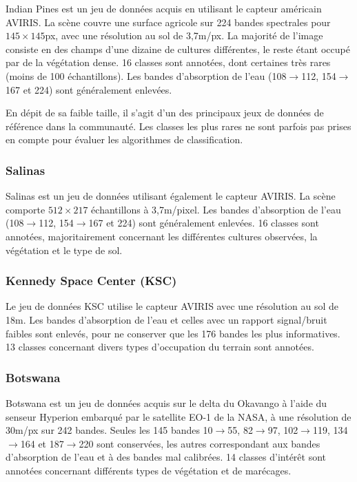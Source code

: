 Indian Pines est un jeu de données acquis en utilisant le capteur américain AVIRIS. La scène couvre une surface agricole sur 224 bandes spectrales pour $145\times145$px, avec une résolution au sol de 3,7m/px. La majorité de l'image consiste en des champs d'une dizaine de cultures différentes, le reste étant occupé par de la végétation dense. 16 classes sont annotées, dont certaines très rares (moins de 100 échantillons). Les bandes d'absorption de l'eau (108$\rightarrow$112, 154$\rightarrow$167 et 224) sont généralement enlevées.

En dépit de sa faible taille, il s'agit d'un des principaux jeux de données de référence dans la communauté. Les classes les plus rares ne sont parfois pas prises en compte pour évaluer les algorithmes de classification.

\subsubsection{Salinas}
Salinas est un jeu de données utilisant également le capteur AVIRIS. La scène comporte $512\times217$ échantillons à 3,7m/pixel. Les bandes d'absorption de l'eau (108$\rightarrow$112, 154$\rightarrow$167 et 224) sont généralement enlevées. 16 classes sont annotées, majoritairement concernant les différentes cultures observées, la végétation et le type de sol.

\subsubsection{Kennedy Space Center (KSC)}
Le jeu de données KSC utilise le capteur AVIRIS avec une résolution au sol de 18m. Les bandes d'absorption de l'eau et celles avec un rapport signal/bruit faibles sont enlevés, pour ne conserver que les 176 bandes les plus informatives. 13 classes concernant divers types d'occupation du terrain sont annotées.

\subsubsection{Botswana}
Botswana est un jeu de données acquis sur le delta du Okavango à l'aide du senseur Hyperion embarqué par le satellite EO-1 de la NASA, à une résolution de 30m/px sur 242 bandes. Seules les 145 bandes 10$\rightarrow$55, 82$\rightarrow$97, 102$\rightarrow$119, 134$\rightarrow$164 et 187$\rightarrow$220 sont conservées, les autres correspondant aux bandes d'absorption de l'eau et à des bandes mal calibrées. 14 classes d'intérêt sont annotées concernant différents types de végétation et de marécages.

